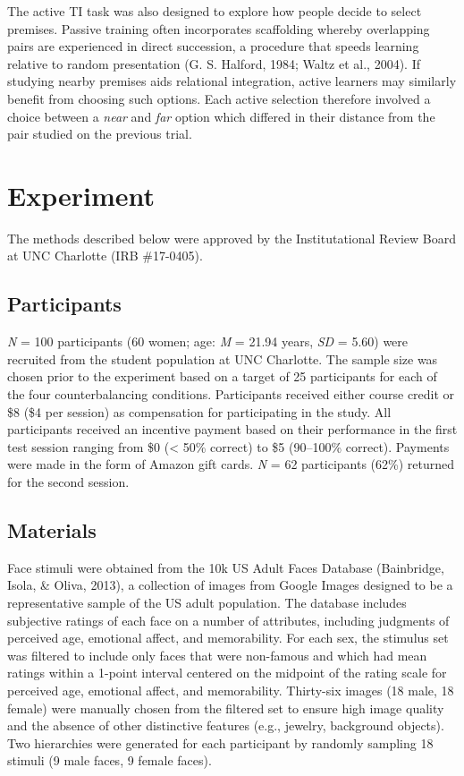 \documentclass[floatsintext,man]{apa6}
\theoremstyle{definition}
\theoremstyle{definition}
\theoremstyle{definition}
\theoremstyle{remark}
\begin{document}
The active TI task was also designed to explore how people decide to
select premises. Passive training often incorporates scaffolding whereby
overlapping pairs are experienced in direct succession, a procedure that
speeds learning relative to random presentation (G. S. Halford, 1984;
Waltz et al., 2004). If studying nearby premises aids relational
integration, active learners may similarly benefit from choosing such
options. Each active selection therefore involved a choice between a
\emph{near} and \emph{far} option which differed in their distance from
the pair studied on the previous trial.

\section{Experiment}\label{experiment}

The methods described below were approved by the Institutational Review
Board at UNC Charlotte (IRB \#17-0405).

\subsection{Participants}\label{participants}

\emph{N} = 100 participants (60 women; age: \emph{M} = 21.94 years,
\emph{SD} = 5.60) were recruited from the student population at UNC
Charlotte. The sample size was chosen prior to the experiment based on a
target of 25 participants for each of the four counterbalancing
conditions. Participants received either course credit or \$8 (\$4 per
session) as compensation for participating in the study. All
participants received an incentive payment based on their performance in
the first test session ranging from \$0 (\textless{} 50\% correct) to
\$5 (90--100\% correct). Payments were made in the form of Amazon gift
cards. \emph{N} = 62 participants (62\%) returned for the second
session.

\subsection{Materials}\label{materials}

Face stimuli were obtained from the 10k US Adult Faces Database
(Bainbridge, Isola, \& Oliva, 2013), a collection of images from Google
Images designed to be a representative sample of the US adult
population. The database includes subjective ratings of each face on a
number of attributes, including judgments of perceived age, emotional
affect, and memorability. For each sex, the stimulus set was filtered to
include only faces that were non-famous and which had mean ratings
within a 1-point interval centered on the midpoint of the rating scale
for perceived age, emotional affect, and memorability. Thirty-six images
(18 male, 18 female) were manually chosen from the filtered set to
ensure high image quality and the absence of other distinctive features
(e.g., jewelry, background objects). Two hierarchies were generated for
each participant by randomly sampling 18 stimuli (9 male faces, 9 female
faces).
\end{document}
